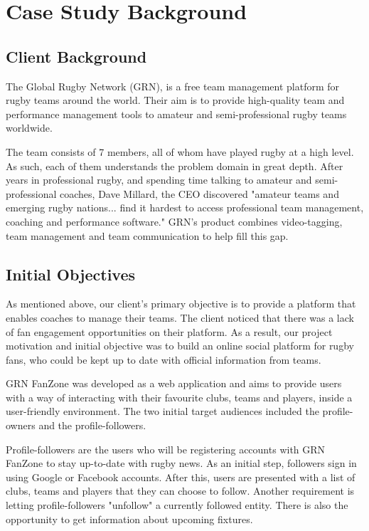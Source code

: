 \documentclass{l3proj}
\begin{document}
\section{Case Study Background}
\label{sec:background}

\subsection{Client Background}

The Global Rugby Network (GRN), is a free team management platform
 for rugby teams around the world. Their aim is to provide high-quality
 team and performance management tools to amateur and semi-professional 
 rugby teams worldwide. 

The team consists of 7 members, all of whom have played rugby at a high level. 
 As such, each of them understands the problem domain in great depth. After years in
 professional rugby, and spending time talking to amateur and semi-professional coaches, 
 Dave Millard, the CEO discovered "amateur teams and emerging rugby nations... find it 
 hardest to access professional team management, coaching and performance software." 
 GRN's product combines video-tagging, team management and team communication to help 
 fill this gap.


\subsection{Initial Objectives}
As mentioned above, our client's primary objective is to provide a platform that
 enables coaches to manage their teams.  The client noticed that there was a lack of
 fan engagement opportunities on their platform. As a result, our project motivation
 and initial objective was to build an online social platform for rugby fans, who could
 be kept up to date with official information from teams.

GRN FanZone was developed as a web application and aims to provide users with a way of
 interacting with their favourite clubs, teams and players, inside a user-friendly
 environment. The two initial target audiences included the profile-owners and the
 profile-followers.

Profile-followers are the users who will be registering accounts with GRN FanZone to
 stay up-to-date with rugby news. As an initial step, followers sign in using Google or
 Facebook accounts. After this, users are presented with a list of clubs, teams and players
 that they can choose to follow. Another requirement is letting profile-followers "unfollow"
 a currently followed entity. There is also the opportunity to get information about
 upcoming fixtures.
\end{document}
